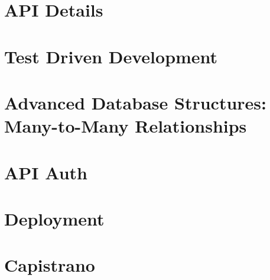 \documentclass[b5paper,openany]{book}
\begin{document}
\chapter{API Details}


\chapter{Test Driven Development}


\chapter{Advanced Database Structures: Many-to-Many Relationships}


\begin{readonly}
    \chapter{API Auth}
    

    \chapter{Deployment}
    

    \chapter{Capistrano}
    
\end{readonly}






\end{document}

